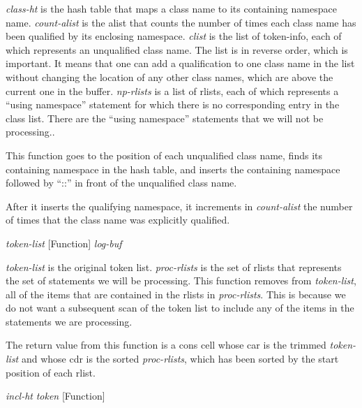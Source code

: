 \begin{doc-string}
\emph{class-ht} is the hash table that maps a class name to its containing namespace
name.  \emph{count-alist} is the alist that counts the number of times each class
name has been qualified by its enclosing namespace.  \emph{clist} is the list of
token-info, each of which represents an unqualified class name.  The list is in
reverse order, which is important.  It means that one can add a qualification to
one class name in the list without changing the location of any other class
names, which are above the current one in the buffer.  \emph{np-rlists} is a list of
rlists, each of which represents a ``using namespace'' statement for which
there is no corresponding entry in the class list.  There are the ``using
namespace'' statements that we will not be processing..

This function goes to the position of each unqualified class name, finds its
containing namespace in the hash table, and inserts the containing namespace
followed by ``::'' in front of the unqualified class name.

After it inserts the qualifying namespace, it increments in \emph{count-alist} the number
of times that the class name was explicitly qualified.
\end{doc-string}

\vspace{1em}
\noindent
{}
\usebox{\funcname}\emph{token-list}
 \hfill [Function]
\hspace*{\wd\funcname}\emph{log-buf}

\begin{doc-string}
\emph{token-list} is the original token list.  \emph{proc-rlists} is the set of rlists that
represents the set of statements we will be processing.  This function removes
from \emph{token-list}, all of the items that are contained in the rlists in
\emph{proc-rlists}.  This is because we do not want a subsequent scan of the token list
to include any of the items in the statements we are processing.

The return value from this function is a cons cell whose car is the trimmed
\emph{token-list} and whose cdr is the sorted \emph{proc-rlists}, which has been sorted by the
start position of each rlist.
\end{doc-string}

\vspace{1em}
\noindent
{}
\usebox{\funcname}\emph{incl-ht} \emph{token}
 \hfill [Function]
\hspace*{\wd\funcname}

